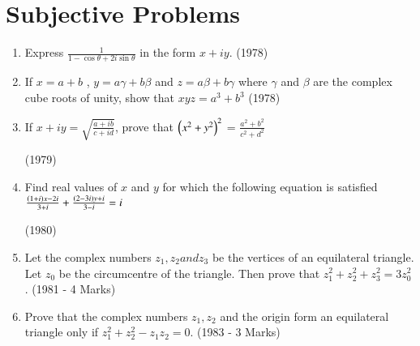 \documentclass[journal,12pt,twocolumn]{IEEEtran}
\theoremstyle{remark}
\begin{document}
    \section{Subjective Problems}
    \begin{enumerate}
    \item Express $ \frac{1}{1-\cos\theta +2i\sin\theta} $ in the form $ x + iy $.
    \hfill (1978)
    \item If $ x = a + b $ , $ y = a\gamma + b\beta $ and $ z = a\beta + b\gamma $ where $ \gamma $ and $ \beta $ are the complex cube roots of unity, show that $ xyz = a^3 + b^3 $ \hfill (1978)
    \item If $ x + iy =\sqrt{\frac{a + ib}{c + id}} $, prove that $ \left(x^2 + y^2\right)^2 $ = $ \frac{a^2 + b^2}{c^2 + d^2} $
 
    \hfill (1979)
    \item Find real values of $ x $ and $ y $ for which the following equation is satisfied $ \frac{\left(1 + i\right)x - 2i}{3 + i} + \frac{\left(2 - 3i\right)y + i}{3 - i} = i $

    \hfill (1980)
    \item Let the complex numbers $ z_1 , z_2 and z_3 $ be the vertices of an equilateral triangle. Let $ z_0 $ be the circumcentre of the triangle. Then prove that $ z_1^2 + z_2^2 + z_3^2 = 3z_0^2 $. \hfill (1981 - 4 Marks)
    \item Prove that the complex numbers $ z_1,z_2 $ and the origin form an equilateral triangle only if $ z_1^2 + z_2^2 - z_1z_2 = 0 $. \hfill (1983 - 3 Marks)
    \end{enumerate} 
    
\end{document}
